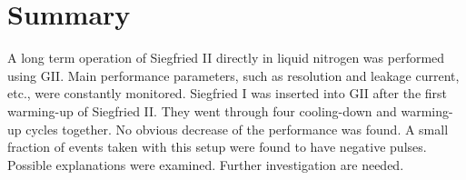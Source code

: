 \section{Summary}
\label{sec:ii:sum}
A long term operation of Siegfried II directly in liquid nitrogen was performed using GII. Main performance parameters, such as resolution and leakage current, etc., were constantly monitored. Siegfried I was inserted into GII after the first warming-up of Siegfried II. They went through four cooling-down and warming-up cycles together. No obvious decrease of the performance was found. A small fraction of events taken with this setup were found to have negative pulses. Possible explanations were examined. Further investigation are needed.


